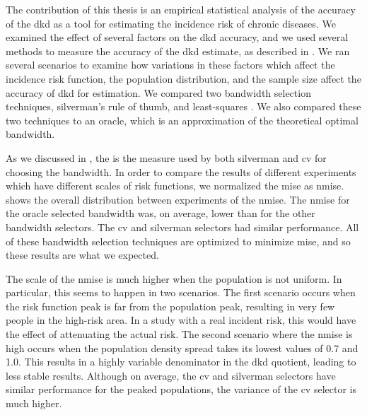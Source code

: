 

The contribution of this thesis is an empirical statistical analysis of the accuracy of the \gls{dkd}
as a tool for estimating the incidence risk of chronic diseases.
We examined the effect of several factors on the \gls{dkd} accuracy,
and we used several methods to measure the accuracy of the \gls{dkd} estimate,
as described in .
We ran several scenarios to examine how variations in these factors which affect the incidence risk function,
the population distribution, and the sample size affect the accuracy of \gls{dkd} for estimation.
We compared two bandwidth selection techniques, \gls{silverman}'s rule of thumb,
and least-squares .
We also compared these two techniques to an \gls{oracle},
which is an approximation of the theoretical optimal bandwidth.

As we discussed in ,
the  is the measure used by both \gls{silverman} and \gls{cv} for choosing the bandwidth.
In order to compare the results of different experiments which have different scales of \gls{risk} functions,
we normalized the \gls{mise} as \gls{nmise}. 
 shows the overall distribution between experiments of the \gls{nmise}.
The \gls{nmise} for the \gls{oracle} selected bandwidth was, on average,
lower than for the other bandwidth selectors.
The \gls{cv} and \gls{silverman} selectors had similar performance.
All of these bandwidth selection techniques are optimized to minimize \gls{mise},
and so these results are what we expected.

The scale of the \gls{nmise} is much higher when the population is not uniform.
In particular, this seems to happen in two scenarios.
The first scenario occurs when the \gls{risk} function peak is far from the population peak, resulting in very few people in the high-risk area.
In a study with a real \gls{incident} \gls{risk},
this would have the effect of attenuating the actual \gls{risk}.
The second scenario where the \gls{nmise} is high occurs when the population density \gls{spread} takes its lowest values of 0.7 and 1.0.
This results in a highly variable denominator in the \gls{dkd} quotient,
leading to less stable results.
Although on average, the \gls{cv} and \gls{silverman} selectors have similar performance for the peaked populations,
the variance of the \gls{cv} selector is much higher.

